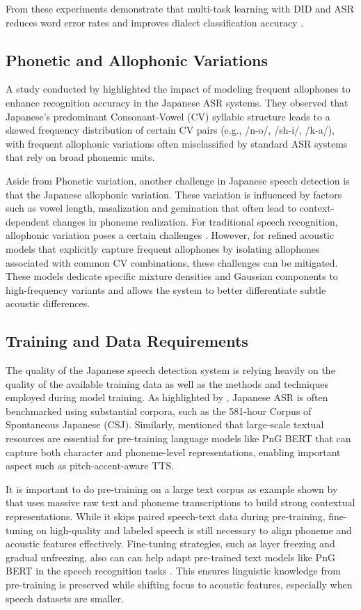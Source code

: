  
From these experiments demonstrate that multi-task learning with DID and ASR reduces word error rates and improves dialect classification accuracy \parencite{takahashi2024comparison}. 

\subsection{Phonetic and Allophonic Variations}
A study conducted by \textcite{Nguyen2002ModelingFA} highlighted the impact of modeling frequent allophones to enhance recognition accuracy in the Japanese ASR systems. They observed that Japanese's predominant Consonant-Vowel (CV) syllabic structure leads to a skewed frequency distribution of certain CV pairs (e.g., /n-o/, /sh-i/, /k-a/), with frequent allophonic variations often misclassified by standard ASR systems that rely on broad phonemic units. 

Aside from Phonetic variation, another challenge in Japanese speech detection is that the Japanese allophonic variation. These variation is influenced by factors such as vowel length, nasalization and gemination that  often lead to context-dependent changes in phoneme realization. For traditional speech recognition, allophonic variation poses a certain challenges \parencite{halpern2008role}. However, for refined acoustic models that explicitly capture frequent allophones by isolating allophones associated with common CV combinations, these challenges can be mitigated. These models dedicate specific mixture densities and Gaussian components to high-frequency variants and allows the system to better differentiate subtle acoustic differences.

\subsection{Training and Data Requirements}
The quality of the Japanese speech detection system is relying heavily on the quality of the available training data as well as the methods and techniques employed during model training. As highlighted by \textcite{Karita2021} , Japanese ASR is often benchmarked using substantial corpora, such as the 581-hour Corpus of Spontaneous Japanese (CSJ). Similarly, \textcite{yasuda2022} mentioned that large-scale textual resources are essential for pre-training language models like PnG BERT that can capture both character and phoneme-level representations, enabling important aspect such as pitch-accent-aware TTS.

It is important to do pre-training on a large text corpus as example shown by \textcite{yasuda2022} that uses massive raw text and phoneme transcriptions to build strong contextual representations. While it skips paired speech-text data during pre-training, fine-tuning on high-quality and labeled speech is still necessary to align phoneme and acoustic features effectively. Fine-tuning strategies, such as layer freezing and gradual unfreezing, also can can help adapt pre-trained text models like PnG BERT in the speech recognition tasks \parencite{ardestani2024study}. This ensures linguistic knowledge from pre-training is preserved while shifting focus to acoustic features, especially when speech datasets are smaller. 


